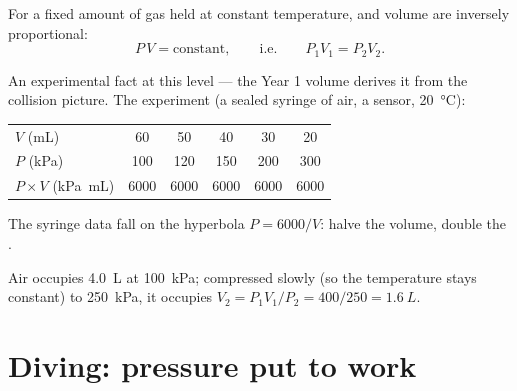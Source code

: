 \begin{proposition}\label{prop:g10:pressure:boyle}
For a fixed amount of gas held at constant temperature,  and
volume are inversely proportional:
\[
P \, V = \text{constant},
\qquad\text{i.e.}\qquad
P_1 V_1 = P_2 V_2 .
\]
\end{proposition}
\admitted

\begin{remark}
An experimental fact at this level --- the Year 1 volume derives it
from the collision picture. The experiment (a sealed syringe of air,
a  sensor, \qty{20}{\degreeCelsius}):
\begin{center}
\begin{tabular}{lccccc}
$V$ (\unit{mL}) & 60 & 50 & 40 & 30 & 20 \\
$P$ (\unit{kPa}) & 100 & 120 & 150 & 200 & 300 \\
$P \times V$ (\unit{kPa.mL}) & 6000 & 6000 & 6000 & 6000 & 6000
\end{tabular}
\end{center}
\end{remark}

\begin{omfigure}

{\small The syringe data fall on the hyperbola $P = 6000/V$: halve the volume, double the .}
\end{omfigure}

\begin{example}\label{ex:g10:pressure:boyle}
Air occupies \qty{4.0}{L} at \qty{100}{kPa}; compressed slowly (so the
temperature stays constant) to \qty{250}{kPa}, it occupies
$V_2 = P_1 V_1 / P_2 = 400/250 = \qty{1.6}{L}$.
\end{example}

\section{Diving: pressure put to work}

